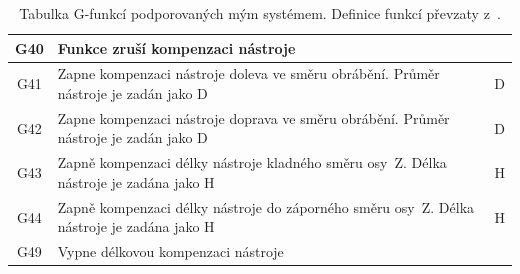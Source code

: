 \begin{table}
\begin{tabularx}{\textwidth}{|c|X|c|}
		        G40    & Funkce zruší kompenzaci nástroje                                                                                                                                                                                                                                                                     & ~                      \\ \hline
		        G41    & Zapne kompenzaci nástroje doleva ve směru obrábění. Průměr nástroje je zadán jako D                                                                                                                                                                                                                  & D                      \\ \hline
		        G42    & Zapne kompenzaci nástroje doprava ve směru obrábění. Průměr nástroje je zadán jako D                                                                                                                                                                                                                 & D                      \\ \hline
		        G43    & Zapně kompenzaci délky nástroje kladného směru osy~Z. Délka nástroje je zadána jako H                                                                                                                                                                                                                 & H                      \\ \hline
		        G44    & Zapně kompenzaci délky nástroje do záporného směru osy~Z. Délka nástroje je zadána jako H                                                                                                                                                                                                             & H                      \\ \hline
		        G49    & Vypne délkovou kompenzaci nástroje                                                                                                                                                                                                                                                                   & ~                      \\
		        \hline
		    \end{tabularx}
		    \caption{Tabulka G-funkcí podporovaných mým systémem. Definice funkcí převzaty z~\cite{gcode}.}\label{tab:funkce}
		\end{table}
		
